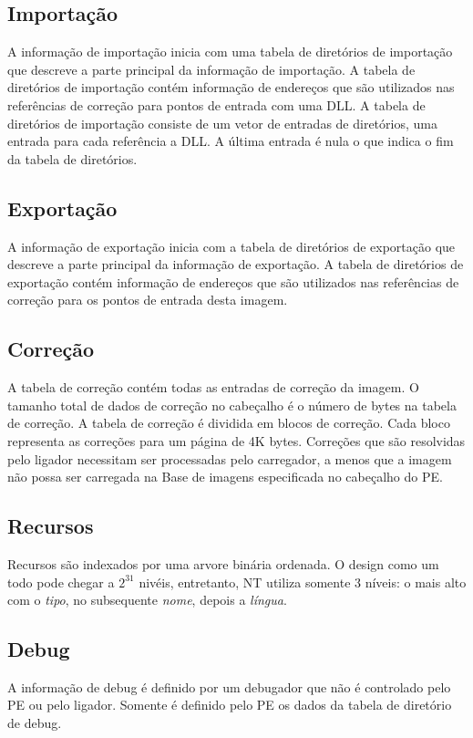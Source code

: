 \subsection{Importação}


A informação de importação inicia com uma tabela de diretórios de
importação que descreve a parte principal da informação de importação.
A tabela de diretórios de importação contém informação de endereços
que são utilizados nas referências de correção para pontos de entrada
com uma DLL. A tabela de diretórios de importação consiste de um vetor
de entradas de diretórios, uma entrada para cada referência a DLL.
A última entrada é nula o que indica o fim da tabela de diretórios.


\subsection{Exportação}


A informação de exportação inicia com a tabela de diretórios de exportação
que descreve a parte principal da informação de exportação. A tabela
de diretórios de exportação contém informação de endereços que são
utilizados nas referências de correção para os pontos de entrada desta
imagem.


\subsection{Correção}


A tabela de correção contém todas as entradas de correção da imagem.
O tamanho total de dados de correção no cabeçalho é o número de bytes
na tabela de correção. A tabela de correção é dividida em blocos de
correção. Cada bloco representa as correções para um página de 4K
bytes. Correções que são resolvidas pelo ligador necessitam ser
processadas pelo carregador, a menos que a imagem não possa ser carregada
na Base de imagens especificada no cabeçalho do PE.


\subsection{Recursos}


Recursos são indexados por uma arvore binária ordenada. O design
como um todo pode chegar a $2^{31}$ nivéis, entretanto, NT utiliza
somente 3 níveis: o mais alto com o \emph{tipo}, no subsequente \emph{nome},
depois a \emph{língua}.


\subsection{Debug}


A informação de debug é definido por um debugador que não é controlado
pelo PE ou pelo ligador. Somente é definido pelo PE os dados da tabela
de diretório de debug.



